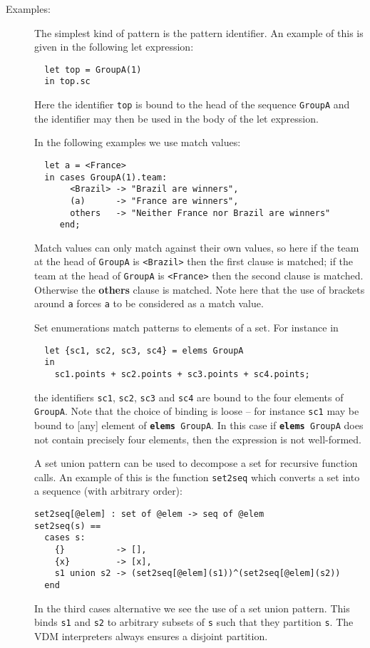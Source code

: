 \documentclass{overturerepchap}
\newcommand{\keyw}[1]{{\bf\ttfamily #1}}
\begin{document}
\begin{description}
\item[Examples:] The simplest kind of pattern is the pattern
identifier. An example of this is given in the following let
expression:
\begin{lstlisting}
  let top = GroupA(1)
  in top.sc
\end{lstlisting}
Here the identifier \texttt{top} is bound to the head of the sequence
\texttt{GroupA} and the identifier may then be used in the body of the
let expression.

In the following examples we use match values:
\begin{lstlisting}
  let a = <France>
  in cases GroupA(1).team:
       <Brazil> -> "Brazil are winners",
       (a)      -> "France are winners",
       others   -> "Neither France nor Brazil are winners"
     end;
\end{lstlisting}
Match values can only match against their own values, so here if the
team at the head of \texttt{GroupA} is \texttt{<Brazil>} then the
first clause is matched; if the team at the head of \texttt{GroupA} is
\texttt{<France>} then the second clause is matched. Otherwise the
\keyw{others} clause is matched. Note here that the use of brackets
around \texttt{a} forces \texttt{a} to be considered as a match value.

Set enumerations match patterns to elements of a set. For instance in
\begin{lstlisting}
  let {sc1, sc2, sc3, sc4} = elems GroupA
  in 
    sc1.points + sc2.points + sc3.points + sc4.points;
\end{lstlisting}
the identifiers \texttt{sc1}, \texttt{sc2}, \texttt{sc3} and
\texttt{sc4} are bound to the four elements of \texttt{GroupA}. Note
that the choice of binding is loose -- for instance
\texttt{sc1} may be bound to [any] element of \texttt{\keyw{elems}
GroupA}. In this case if \texttt{\keyw{elems} GroupA} does not contain
precisely four elements, then the expression is not well-formed.

A set union pattern can be used to decompose a set for recursive
function calls. An example of this is the function \texttt{set2seq}
which converts a set into a sequence (with arbitrary order):
\begin{lstlisting}
set2seq[@elem] : set of @elem -> seq of @elem
set2seq(s) ==
  cases s:
    {}          -> [],
    {x}         -> [x],
    s1 union s2 -> (set2seq[@elem](s1))^(set2seq[@elem](s2))
  end
\end{lstlisting}
In the third cases alternative we see the use of a set union pattern. This
binds \texttt{s1} and \texttt{s2} to arbitrary subsets of \texttt{s}
such that they partition \texttt{s}. The VDM interpreters always
ensures a disjoint partition.


\end{description}
\end{document}
